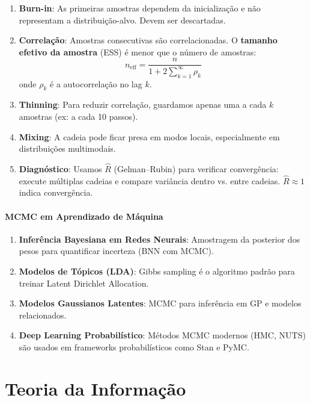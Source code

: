 \documentclass{tufte-handout}
\begin{document}
\begin{enumerate}
    \item \textbf{Burn-in}: As primeiras amostras dependem da inicialização e não
    representam a distribuição-alvo. Devem ser descartadas.
    \item \textbf{Correlação}: Amostras consecutivas são correlacionadas. O \textbf{tamanho
    efetivo da amostra} (ESS) é menor que o número de amostras:
    \[
    n_{\text{eff}} = \frac{n}{1 + 2\sum_{k=1}^\infty \rho_k}
    \]
    onde $\rho_k$ é a autocorrelação no lag $k$.
    \item \textbf{Thinning}: Para reduzir correlação, guardamos apenas uma a cada $k$
    amostras (ex: a cada 10 passos).
    \item \textbf{Mixing}: A cadeia pode ficar presa em modos locais, especialmente
    em distribuições multimodais.
    \item \textbf{Diagnóstico}: Usamos $\hat{R}$ (Gelman--Rubin) para verificar
    convergência: execute múltiplas cadeias e compare variância dentro vs. entre cadeias.
    $\hat{R} \approx 1$ indica convergência.
\end{enumerate}

\subsection{MCMC em Aprendizado de Máquina}

\begin{enumerate}
    \item \textbf{Inferência Bayesiana em Redes Neurais}: Amostragem da posterior dos
    pesos para quantificar incerteza (BNN com MCMC).
    \item \textbf{Modelos de Tópicos (LDA)}: Gibbs sampling é o algoritmo padrão para
    treinar Latent Dirichlet Allocation.
    \item \textbf{Modelos Gaussianos Latentes}: MCMC para inferência em GP e modelos
    relacionados.
    \item \textbf{Deep Learning Probabilístico}: Métodos MCMC modernos (HMC, NUTS) são
    usados em frameworks probabilísticos como Stan e PyMC.
\end{enumerate}


\part{Teoria da Informação}
\end{document}
